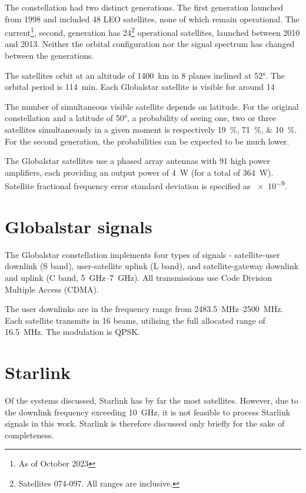 The constellation had two distinct generations. The first generation launched from 1998 and included 48 LEO satellites, none of which remain operational. The current\footnote{As of October 2023}, second, generation has 24\footnote{Satellites 074-097. All ranges are inclusive.} operational satellites, launched between 2010 and 2013. Neither the orbital configuration nor the signal spectrum has changed between the generations\cite{sat15}.


The satellites orbit at an altitude of \qty{1400}{km} in 8 planes inclined at \ang{52}. The orbital period is \qty{114}{min}. Each Globalstar satellite is visible for around \qty{14}{\min}\cite{sat14, sat15}

The number of simultaneous visible satellite depends on latitude. For the original constellation and a latitude of \ang{50}, a probability of seeing one, two or three satellites simultaneously in a given moment is respectively \qtylist{19;71;10}{\percent}\cite{sop07}. For the second generation, the probabilities can be expected to be much lower.

The Globalstar satellites use a phased array antennas with 91 high power amplifiers, each providing an output power of \qty{4}{W} (for a total of \qty{364}{W})\cite{sat14}. Satellite fractional frequency error standard deviation is specified as \num{e-9}\cite{sop07}.


\section{Globalstar signals}
The Globalstar constellation implements four types of signals - satellite-user downlink (S band), user-satellite uplink (L band), and satellite-gateway downlink and uplink (C band, \qtyrange{5}{7}{GHz}). All transmissions use Code Division Multiple Access (CDMA)\cite{sat10}.

The user downlinks are in the frequency range from \qtyrange{2483.5}{2500}{MHz}. Each satellite transmits in 16 beams, utilising the full allocated range of \qty{16.5}{MHz}. The modulation is QPSK\cite{sat14}.

\section{Starlink}
Of the systems discussed, Starlink has by far the most satellites. However, due to the downlink frequency exceeding \qty{10}{GHz}, it is not feasible to process Starlink signals in this work. Starlink is therefore discussed only briefly for the sake of completeness.

